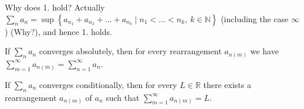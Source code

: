 Why does 1. hold? Actually \(\sum_{n} a_n = \sup \left\{ a_{n_1} + a_{n_2} + \dots + a_{n_k} \mid n_1 < \dots < n_k, \ k \in \mathbb{N} \right\}  \) (including the case \(\infty \)) (Why?), and hence 1. holds.

\begin{theorem}
    If \(\sum_{n} a_n \) converges absolutely, then for every rearrangement \(a_{n(m)}\) we have \(\sum_{m=1}^{\infty} a_{n(m)} = \sum_{n=1}^{\infty} a_n \).   
\end{theorem}

\begin{theorem}
    If \(\sum_{n} a_n \) converges conditionally, then for every \(L \in \mathbb{R} \) there exists a rearrangement \(a_{n(m)}\) of \(a_n\) such that \(\sum_{m=1}^{\infty} a_{n(m)} = L\).     
\end{theorem}
